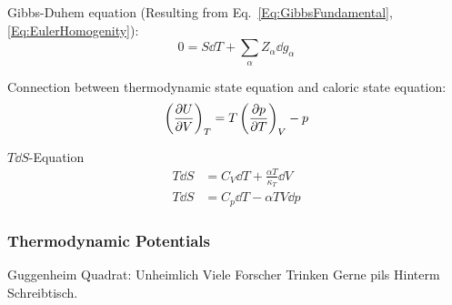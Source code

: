 			\noindent
			Gibbs-Duhem equation (Resulting from Eq.~\ref{Eq:GibbsFundamental}, \ref{Eq:EulerHomogenity}):
			\begin{equation}
				0 = S \dd T + \sum_\alpha Z_\alpha \dd g_\alpha
			\end{equation}

			\noindent
			Connection between thermodynamic state equation and caloric state equation:
			\begin{equation}
				\left(\pdv{U}{V}\right)_T = T\left(\pdv{p}{T}\right)_V - p
			\end{equation}

			\noindent
			$T \dd S$-Equation
			\begin{equation}
				\begin{aligned}
					T \dd S &= C_V \dd T + \frac{\alpha T}{\kappa_T} \dd V \\
					T \dd S &= C_p \dd T - \alpha T V \dd p
				\end{aligned}
			\end{equation}


		\subsubsection{Thermodynamic Potentials}
			\noindent
			Guggenheim Quadrat:
			Unheimlich Viele Forscher Trinken Gerne pils Hinterm Schreibtisch. %

